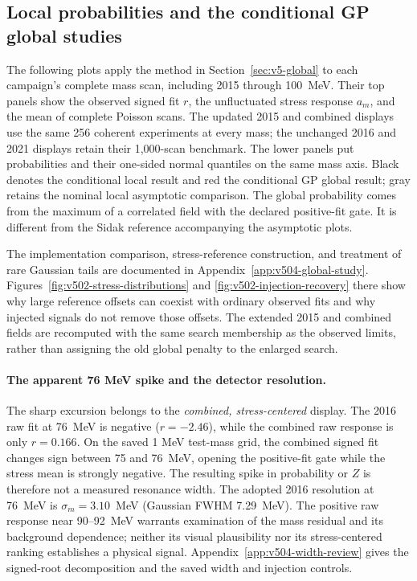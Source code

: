 \subsection{Local probabilities and the conditional GP global studies}
\label{sec:v5-global-results}

The following plots apply the method in Section~\ref{sec:v5-global} to each
campaign's complete mass scan, including 2015 through 100~MeV. Their top panels show the observed signed fit
$r$, the unfluctuated stress response $a_m$, and the mean of complete Poisson scans. The updated 2015 and combined
displays use the same 256 coherent experiments at every mass; the unchanged
2016 and 2021 displays retain their 1,000-scan benchmark. The lower panels put probabilities and their one-sided normal
quantiles on the same mass axis. Black denotes the conditional local result
and red the conditional GP global result; gray retains the nominal local
asymptotic comparison. The global probability comes from the maximum of a
correlated field with the declared positive-fit gate. It is different from
the Sidak reference accompanying the asymptotic plots.


The implementation comparison, stress-reference construction, and treatment of
rare Gaussian tails are documented in Appendix~\ref{app:v504-global-study}.
Figures~\ref{fig:v502-stress-distributions} and
\ref{fig:v502-injection-recovery} there show why large reference offsets can
coexist with ordinary observed fits and why injected signals do not remove
those offsets. The extended 2015 and combined fields are recomputed with the
same search membership as the observed limits, rather than assigning the old
global penalty to the enlarged search.

\paragraph{The apparent 76 MeV spike and the detector resolution.}
The sharp excursion belongs to the \emph{combined, stress-centered} display.
The 2016 raw fit at 76~MeV is negative ($r=-2.46$), while the combined raw
response is only $r=0.166$. On the saved 1 MeV test-mass grid, the combined signed fit changes sign
between 75 and 76~MeV, opening the positive-fit gate while the stress mean is strongly
negative. The resulting spike in probability or $Z$ is therefore not a
measured resonance width. The adopted 2016 resolution at 76~MeV is
$\sigma_m=3.10$~MeV (Gaussian FWHM 7.29~MeV). The positive raw response near
90--92~MeV warrants examination of the mass residual and its background
dependence; neither its visual plausibility nor its stress-centered ranking
establishes a physical signal. Appendix~\ref{app:v504-width-review} gives
the signed-root decomposition and the saved width and injection controls.

